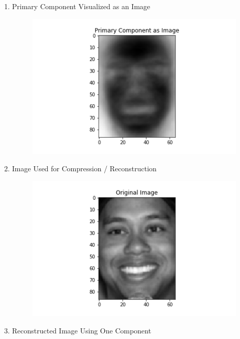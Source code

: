 \documentclass[12pt]{article}
\begin{document}
\begin{enumerate}
    \item Primary Component Visualized as an Image
    \begin{figure}[H]
        \begin{center}
        \includegraphics{images/primary_component_as_image.png}
        \label{GD}
        \end{center}
    \end{figure}
    \item Image Used for Compression / Reconstruction
    \begin{figure}[H]
        \begin{center}
        \includegraphics{images/original_image.png}
        \label{GD}
        \end{center}
    \end{figure}
    \item Reconstructed Image Using One Component
    \begin{figure}[H]
        \begin{center}

\end{center}
\end{figure}
\end{enumerate}
\end{document}
